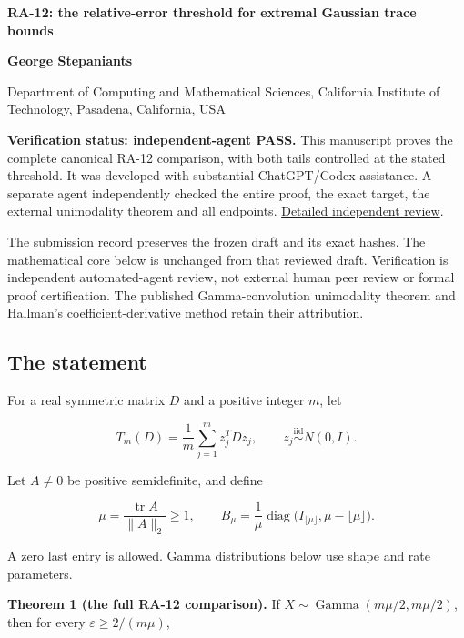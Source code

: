 \documentclass[10pt,a4paper]{article}
\begin{document}
{\raggedright\Large\bfseries RA-12: the relative-error threshold for
extremal Gaussian trace bounds\par}
\vspace{0.4em}
{\normalsize\bfseries George Stepaniants\par}
{\small Department of Computing and Mathematical Sciences, California
Institute of Technology, Pasadena, California, USA\par}
\vspace{0.6em}
\textbf{Verification status: independent-agent PASS.} This manuscript
proves the complete canonical RA-12 comparison, with both tails
controlled at the stated threshold. It was developed with substantial
ChatGPT/Codex assistance. A separate agent independently checked the
entire proof, the exact target, the external unimodality theorem and all
endpoints.
\href{https://github.com/ajt60gaibb/OpenProblemsInNLA/blob/main/references/stepaniants-ra12-2026-09-11/verification/RA-12-independent-review.md}{Detailed
independent review}.

The
\href{https://github.com/ajt60gaibb/OpenProblemsInNLA/blob/main/references/stepaniants-ra12-2026-09-11/README.md}{submission
record} preserves the frozen draft and its exact hashes. The
mathematical core below is unchanged from that reviewed draft.
Verification is independent automated-agent review, not external human
peer review or formal proof certification. The published
Gamma-convolution unimodality theorem and Hallman's
coefficient-derivative method retain their attribution.

\subsection{The statement}\label{the-statement}

For a real symmetric matrix \(D\) and a positive integer \(m\), let

\[
T_m(D)=\frac1m\sum_{j=1}^m z_j^TDz_j,
\qquad z_j\overset{\mathrm{iid}}\sim N(0,I).
\]

Let \(A\ne0\) be positive semidefinite, and define

\[
\mu=\frac{\operatorname{tr}A}{\|A\|_2}\ge1,
\qquad
B_\mu=\frac1\mu\operatorname{diag}
\bigl(I_{\lfloor\mu\rfloor},\mu-\lfloor\mu\rfloor\bigr).
\]

A zero last entry is allowed. Gamma distributions below use shape and
rate parameters.

\textbf{Theorem 1 (the full RA-12 comparison).} If
\(X\sim\operatorname{Gamma}(m\mu/2,m\mu/2)\), then for every
\(\varepsilon\ge2/(m\mu)\),
\end{document}
